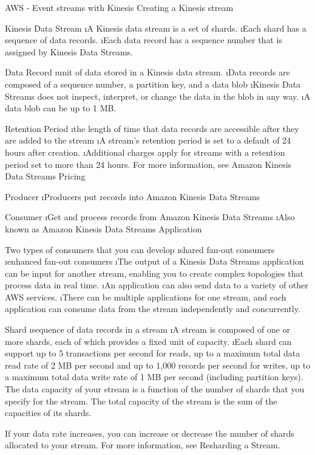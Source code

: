 \begin{frame}{AWS - Event streams with Kinesis}
Creating a Kinesis stream

Kinesis Data Stream
\i A Kinesis data stream is a set of shards. 
\i Each shard has a sequence of data records. 
\i Each data record has a sequence number that is assigned by Kinesis Data Streams.

Data Record
\i unit of data stored in a Kinesis data stream. 
\i Data records are composed of a sequence number, a partition key, and a data blob
\i Kinesis Data Streams does not inspect, interpret, or change the data in the blob in any way. 
\i A data blob can be up to 1 MB.

Retention Period
\i the length of time that data records are accessible after they are added to the stream
\i A stream’s retention period is set to a default of 24 hours after creation.
\i Additional charges apply for streams with a retention period set to more than 24 hours. For more information, see Amazon Kinesis Data Streams Pricing

Producer
\i Producers put records into Amazon Kinesis Data Streams

Consumer
\i Get and process records from Amazon Kinesis Data Streams
\i Also known as Amazon Kinesis Data Streams Application

Two types of consumers that you can develop
\i shared fan-out consumers 
\i enhanced fan-out consumers
\i The output of a Kinesis Data Streams application can be input for another stream, enabling you to create complex topologies that process data in real time. 
\i An application can also send data to a variety of other AWS services. 
\i There can be multiple applications for one stream, and each application can consume data from the stream independently and concurrently.

Shard
\i sequence of data records in a stream
\i A stream is composed of one or more shards, each of which provides a fixed unit of capacity. 
\i Each shard can support up to 5 transactions per second for reads, up to a maximum total data read rate of 2 MB per second and up to 1,000 records per second for writes, up to a maximum total data write rate of 1 MB per second (including partition keys). The data capacity of your stream is a function of the number of shards that you specify for the stream. The total capacity of the stream is the sum of the capacities of its shards.

If your data rate increases, you can increase or decrease the number of shards allocated to your stream. For more information, see Resharding a Stream.



\end{frame}

